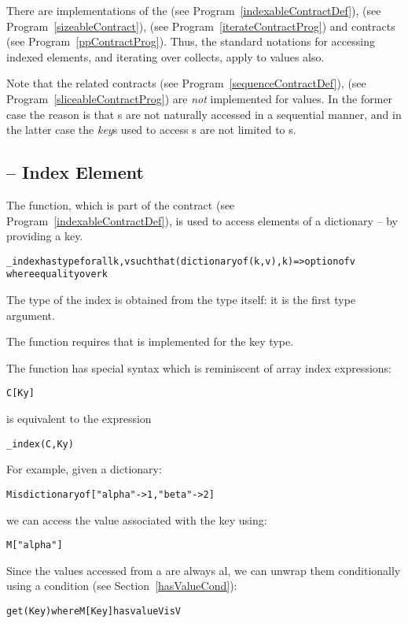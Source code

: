 There are implementations of the  (see Program~\vref{indexableContractDef}),  (see Program~\vref{sizeableContract}),  (see Program~\vref{iterateContractProg}) and  contracts (see Program~\vref{ppContractProg}). Thus, the standard notations for accessing indexed elements, and iterating over collects, apply to  values also.

Note that the related contracts  (see Program~\vref{sequenceContractDef}),  (see Program~\vref{sliceableContractProg}) are \emph{not} implemented for  values. In the former case the reason is that s are not naturally accessed in a sequential manner, and in the latter case the \emph{key}s used to access s are not limited to s.

\subsection{ -- Index Element}
\label{indexMapFunction}
The  function, which is part of the  contract (see Program~\vref{indexableContractDef}), is used to access elements of a dictionary -- by providing a key.
\begin{alltt}
_index has type for all k,v such that (dictionary of (k,v),k)=>option of v
                where equality over k
\end{alltt}
\begin{aside}
The type of the index is obtained from the  type itself: it is the first type argument.
\end{aside}

\begin{aside}
The  function requires that  is implemented for the key type.
\end{aside}

\noindent
The  function has special syntax which is reminiscent of array index expressions:
\begin{alltt}
C[Ky]
\end{alltt}
is equivalent to the expression
\begin{alltt}
\_index(C,Ky)
\end{alltt}
For example, given a dictionary:
\begin{alltt}
M is dictionary of [ "alpha"->1, "beta"->2 ]
\end{alltt}
we can access the value associated with the key  using:
\begin{alltt}
M["alpha"]
\end{alltt}
Since the values accessed from a  are always al, we can unwrap them conditionally using a  condition (see Section~\vref{hasValueCond}):
\begin{alltt}
get(Key) where M[Key] has value V is V
\end{alltt}

